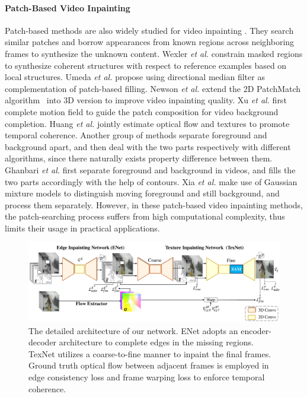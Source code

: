 \paragraph{Patch-Based Video Inpainting} Patch-based methods are also widely studied for video inpainting \cite{wexler2007space,tcsvt2009,umeda2012removal,xu2015video}. 
They search similar patches and borrow appearances from known regions across neighboring frames to synthesize the unknown content. 
Wexler \emph{et al.} \cite{wexler2007space} constrain masked regions to synthesize coherent structures with respect to reference examples based on local structures. 
Umeda \emph{et al.} \cite{umeda2012removal} propose using directional median filter as complementation of patch-based filling.
Newson \emph{et al.} \cite{newson2014video} extend the 2D PatchMatch algorithm~\cite{barnes2009patchmatch} into 3D version to improve video inpainting quality.
Xu \emph{et al.} \cite{xu2015video} first complete motion field to guide the patch composition for video background completion.
Huang \emph{et al.} \cite{huang2016temporally} jointly estimate optical flow and textures to promote temporal coherence.
%
Another group of methods separate foreground and background apart, and then deal with the two parts respectively with different algorithms, since there naturally exists property difference between them.  
Ghanbari \emph{et al.} \cite{ghanbari2011contour} first separate foreground and background in videos, and fills the two parts accordingly with the help of contours.
Xia \emph{et al.} \cite{xia2011exemplar} make use of Gaussian mixture models to distinguish moving foreground and still background, and process them separately.   
However, in these patch-based video inpainting methods, the patch-searching process suffers from high computational complexity, thus limits their usage in practical applications.



\begin{figure}[!t]
	\centering
	\includegraphics[width=2.05\columnwidth]{sti} %
	\caption{The detailed architecture of our network. ENet adopts an encoder-decoder architecture to complete edges in the missing regions. TexNet utilizes a coarse-to-fine manner to inpaint the final frames. Ground truth optical flow between adjacent frames is employed in edge consistency loss and frame warping loss to enforce temporal coherence. }
	\label{fig:stiNet}
\end{figure}

